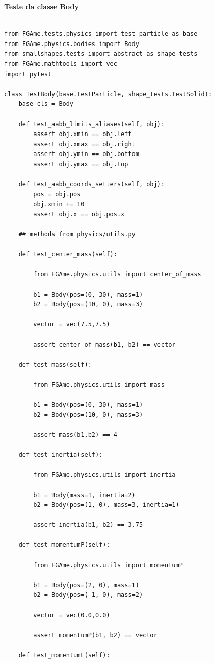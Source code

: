 \begin{anexosenv}
{\LARGE \textbf{Teste da classe Body}}

\begin{lstlisting}

from FGAme.tests.physics import test_particle as base
from FGAme.physics.bodies import Body
from smallshapes.tests import abstract as shape_tests
from FGAme.mathtools import vec
import pytest

class TestBody(base.TestParticle, shape_tests.TestSolid):
    base_cls = Body

    def test_aabb_limits_aliases(self, obj):
        assert obj.xmin == obj.left
        assert obj.xmax == obj.right
        assert obj.ymin == obj.bottom
        assert obj.ymax == obj.top

    def test_aabb_coords_setters(self, obj):
        pos = obj.pos
        obj.xmin += 10
        assert obj.x == obj.pos.x

    ## methods from physics/utils.py

    def test_center_mass(self):

        from FGAme.physics.utils import center_of_mass

        b1 = Body(pos=(0, 30), mass=1)
        b2 = Body(pos=(10, 0), mass=3)

        vector = vec(7.5,7.5)

        assert center_of_mass(b1, b2) == vector

    def test_mass(self):

        from FGAme.physics.utils import mass

        b1 = Body(pos=(0, 30), mass=1)
        b2 = Body(pos=(10, 0), mass=3)

        assert mass(b1,b2) == 4

    def test_inertia(self):

        from FGAme.physics.utils import inertia

        b1 = Body(mass=1, inertia=2)
        b2 = Body(pos=(1, 0), mass=3, inertia=1)

        assert inertia(b1, b2) == 3.75

    def test_momentumP(self):

        from FGAme.physics.utils import momentumP

        b1 = Body(pos=(2, 0), mass=1)
        b2 = Body(pos=(-1, 0), mass=2)

        vector = vec(0.0,0.0)

        assert momentumP(b1, b2) == vector

    def test_momentumL(self):


\end{lstlisting}
\end{anexosenv}
